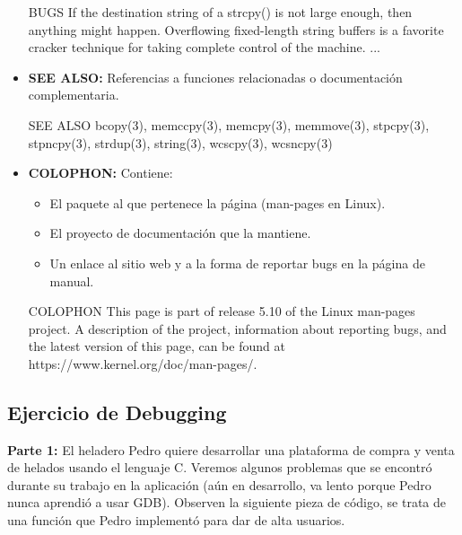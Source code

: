\documentclass[]{scrartcl}
\begin{document}
\begin{itemize}
  \begin{bashbox}[]
    BUGS
       If the destination string of a strcpy() is not large enough,
       then anything might happen. 
       Overflowing fixed-length string buffers is a favorite cracker
       technique for taking complete control of the machine.
       ...
  \end{bashbox}
  \item \textbf{SEE ALSO:} Referencias a funciones relacionadas o documentación complementaria.
  \begin{bashbox}[]
    SEE ALSO
       bcopy(3), memccpy(3), memcpy(3), memmove(3), stpcpy(3), 
       stpncpy(3), strdup(3), string(3), wcscpy(3), wcsncpy(3)
  \end{bashbox}
  \item \textbf{COLOPHON: } Contiene:
  \begin{itemize}
    \item El paquete al que pertenece la página (man-pages en Linux).
    \item El proyecto de documentación que la mantiene.
    \item Un enlace al sitio web y a la forma de reportar bugs en la página de manual. 
  \end{itemize}
  \begin{bashbox}[]
    COLOPHON
       This page is part of release 5.10 of the Linux man-pages project.
       A description of the project, information about reporting bugs, 
       and the latest version of this page, can be found at 
       https://www.kernel.org/doc/man-pages/.
  \end{bashbox}
\end{itemize}

\newpage
\subsection*{Ejercicio de Debugging}

\textbf{Parte 1:}
El heladero Pedro quiere desarrollar una plataforma de compra y venta de helados usando el lenguaje C. Veremos algunos problemas que se encontró durante su trabajo en la aplicación (aún en desarrollo, va lento porque Pedro nunca aprendió a usar GDB).
Observen la siguiente pieza de código, se trata de una función que Pedro implementó para dar de alta usuarios.
\end{document}

